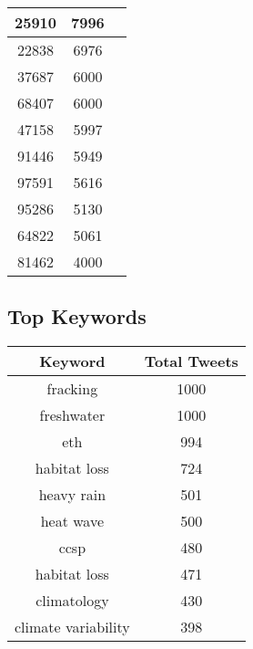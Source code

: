 \documentclass{article}\usepackage[T1]{fontenc}
\begin{document}
\begin{tabular}{|c|c|c|}
 \hline
25910 & 7996\\ 
 \hline
22838 & 6976\\ 
 \hline
37687 & 6000\\ 
 \hline
68407 & 6000\\ 
 \hline
47158 & 5997\\ 
 \hline
91446 & 5949\\ 
 \hline
97591 & 5616\\ 
 \hline
95286 & 5130\\ 
 \hline
64822 & 5061\\ 
 \hline
81462 & 4000\\ 
 \hline
\end{tabular}\subsection*{Top Keywords}\begin{tabular}{|c|c|}         \hline         Keyword & Total Tweets \\ 
 \hline
fracking & 1000\\ 
 \hline
freshwater & 1000\\ 
 \hline
eth & 994\\ 
 \hline
habitat loss & 724\\ 
 \hline
heavy rain & 501\\ 
 \hline
heat wave & 500\\ 
 \hline
ccsp & 480\\ 
 \hline
habitat loss & 471\\ 
 \hline
climatology & 430\\ 
 \hline
climate variability & 398\\ 
 \hline
\end{tabular}
\end{document}
